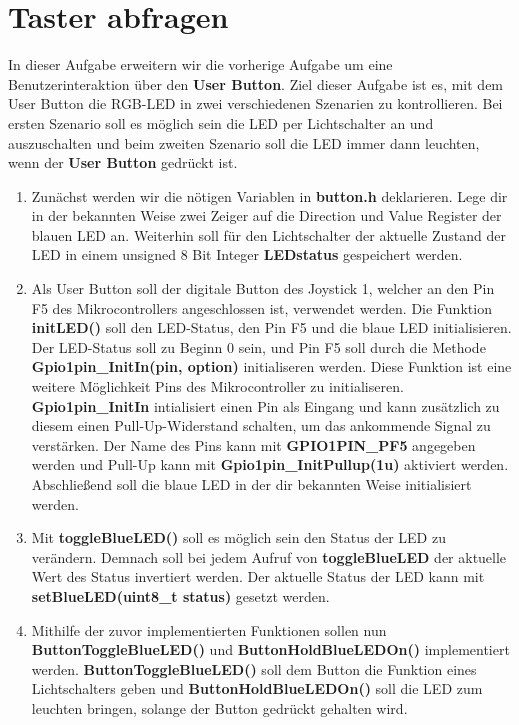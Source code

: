 \section{\ExercisePrefixEmbeddedC Taster abfragen \optional}

In dieser Aufgabe erweitern wir die vorherige Aufgabe um eine Benutzerinteraktion über den \textbf{User Button}.
Ziel dieser Aufgabe ist es, mit dem User Button die RGB-LED in zwei verschiedenen Szenarien zu kontrollieren.
Bei ersten Szenario soll es möglich sein die LED per Lichtschalter an und auszuschalten und beim zweiten Szenario soll die LED immer dann leuchten, wenn der \textbf{User Button} gedrückt ist.

\begin{enumerate}
\item 
Zunächst werden wir die nötigen Variablen in \textbf{button.h} deklarieren. Lege dir in der bekannten Weise zwei Zeiger auf die Direction und Value Register der blauen LED an. Weiterhin soll für den Lichtschalter der aktuelle Zustand der LED in einem unsigned 8 Bit Integer \textbf{LEDstatus} gespeichert werden.

\item Als User Button soll der digitale Button des Joystick 1, welcher an den Pin F5 des Mikrocontrollers angeschlossen ist, verwendet werden. Die Funktion \textbf{initLED()} soll den LED-Status, den Pin F5 und die blaue LED initialisieren. Der LED-Status soll zu Beginn 0 sein, und Pin F5 soll durch die Methode \textbf{Gpio1pin\_InitIn(pin, option) }initialiseren werden. Diese Funktion ist eine weitere Möglichkeit Pins des Mikrocontroller zu initialiseren. \textbf{Gpio1pin\_InitIn} intialisiert einen Pin als Eingang und kann zusätzlich zu diesem einen Pull-Up-Widerstand schalten, um das ankommende Signal zu verstärken. Der Name des Pins kann mit \textbf{GPIO1PIN\_PF5} angegeben werden und Pull-Up kann mit \textbf{Gpio1pin\_InitPullup(1u)} aktiviert werden. Abschließend soll die blaue LED in der dir bekannten Weise initialisiert werden. 

\item Mit \textbf{toggleBlueLED()} soll es möglich sein den Status der LED zu verändern. Demnach soll bei jedem Aufruf von \textbf{toggleBlueLED} der aktuelle Wert des Status invertiert werden. Der aktuelle Status der LED kann mit \textbf{setBlueLED(uint8\_t status)} gesetzt werden. 

\item Mithilfe der zuvor implementierten Funktionen sollen nun \textbf{ButtonToggleBlueLED()} und \textbf{ButtonHoldBlueLEDOn()} implementiert werden. \textbf{ButtonToggleBlueLED()} soll dem Button die Funktion eines Lichtschalters geben und  \textbf{ButtonHoldBlueLEDOn()} soll die LED zum leuchten bringen, solange der Button gedrückt gehalten wird. 

\end{enumerate}
